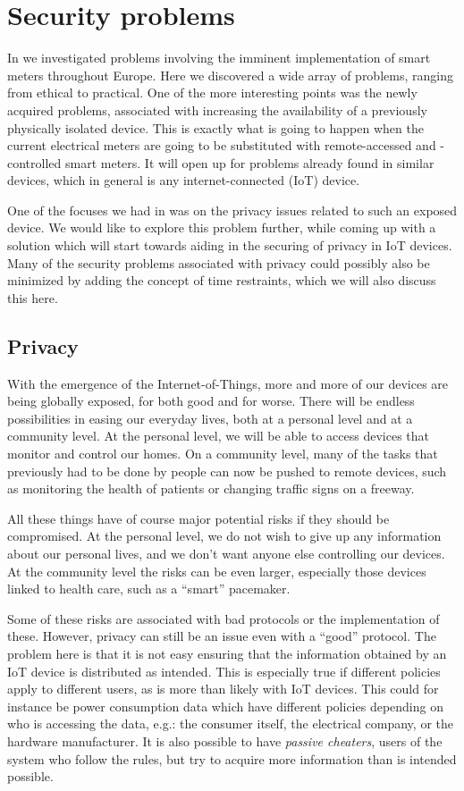
\section{Security problems}
In \cite{prespecialization} we investigated problems involving the imminent implementation of smart meters throughout Europe.
Here we discovered a wide array of problems, ranging from ethical to practical.
One of the more interesting points was the newly acquired problems, associated with increasing the availability of a previously physically isolated device.
This is exactly what is going to happen when the current electrical meters are going to be substituted with remote-accessed and -controlled smart meters.
It will open up for problems already found in similar devices, which in general is any internet-connected (IoT) device.

One of the focuses we had in \cite{prespecialization} was on the privacy issues related to such an exposed device.
We would like to explore this problem further, while coming up with a solution which will start towards aiding in the securing of privacy in IoT devices.
Many of the security problems associated with privacy could possibly also be minimized by adding the concept of time restraints, which we will also discuss this here.

\subsection{Privacy}
With the emergence of the Internet-of-Things, more and more of our devices are being globally exposed, for both good and for worse.
There will be endless possibilities in easing our everyday lives, both at a personal level and at a community level.
At the personal level, we will be able to access devices that monitor and control our homes.
On a community level, many of the tasks that previously had to be done by people can now be pushed to remote devices, such as monitoring the health of patients or changing traffic signs on a freeway.

All these things have of course major potential risks if they should be compromised.
At the personal level, we do not wish to give up any information about our personal lives, and we don't want anyone else controlling our devices.
At the community level the risks can be even larger, especially those devices linked to health care, such as a ``smart'' pacemaker.

Some of these risks are associated with bad protocols or the implementation of these.
However, privacy can still be an issue even with a ``good'' protocol.
The problem here is that it is not easy ensuring that the information obtained by an IoT device is distributed as intended.
This is especially true if different policies apply to different users, as is more than likely with IoT devices.
This could for instance be power consumption data which have different policies depending on who is accessing the data, e.g.: the consumer itself, the electrical company, or the hardware manufacturer.
It is also possible to have \emph{passive cheaters}, users of the system who follow the rules, but try to acquire more information than is intended possible.

